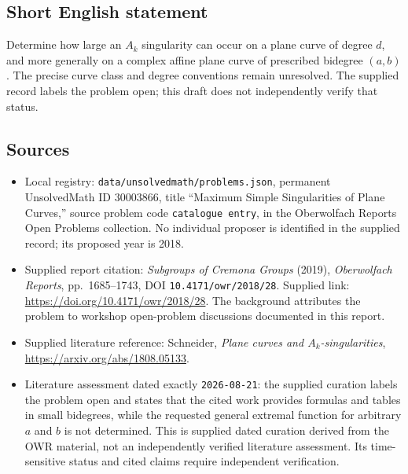 \documentclass[11pt]{article}
\begin{document}
\subsection{Short English statement}
Determine how large an \(A_k\) singularity can occur on a plane curve of degree \(d\), and more generally on a complex affine plane curve of prescribed bidegree \((a,b)\). The precise curve class and degree conventions remain unresolved. The supplied record labels the problem open; this draft does not independently verify that status.
\subsection{Sources}
\begin{itemize}
\item Local registry: \texttt{data/unsolvedmath/problems.json}, permanent UnsolvedMath ID \(30003866\), title ``Maximum Simple Singularities of Plane Curves,'' source problem code \texttt{catalogue entry}, in the Oberwolfach Reports Open Problems collection. No individual proposer is identified in the supplied record; its proposed year is 2018.
\item Supplied report citation: \emph{Subgroups of Cremona Groups} (2019), \emph{Oberwolfach Reports}, pp.~1685--1743, DOI \texttt{10.4171/owr/2018/28}. Supplied link: \url{https://doi.org/10.4171/owr/2018/28}. The background attributes the problem to workshop open-problem discussions documented in this report.
\item Supplied literature reference: Schneider, \emph{Plane curves and \(A_k\)-singularities}, \url{https://arxiv.org/abs/1808.05133}.
\item Literature assessment dated exactly \texttt{2026-08-21}: the supplied curation labels the problem open and states that the cited work provides formulas and tables in small bidegrees, while the requested general extremal function for arbitrary \(a\) and \(b\) is not determined. This is supplied dated curation derived from the OWR material, not an independently verified literature assessment. Its time-sensitive status and cited claims require independent verification.
\end{itemize}
\end{document}
